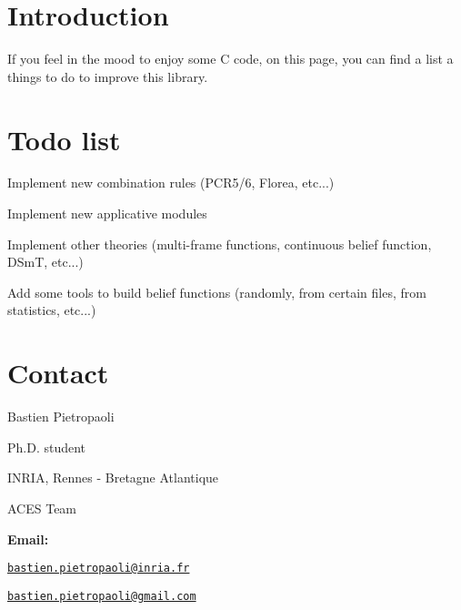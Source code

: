 \hypertarget{_t_o_d_o_TODO_Intro}{}\section{Introduction}\label{_t_o_d_o_TODO_Intro}
If you feel in the mood to enjoy some C code, on this page, you can find a list a things to do to improve this library.\hypertarget{_t_o_d_o_Todo_list}{}\section{Todo list}\label{_t_o_d_o_Todo_list}
\begin{DoxyItemize}
\item Implement new combination rules (PCR5/6, Florea, etc...) \item Implement new applicative modules \item Implement other theories (multi-\/frame functions, continuous belief function, DSmT, etc...) \item Add some tools to build belief functions (randomly, from certain files, from statistics, etc...)\end{DoxyItemize}
\hypertarget{_t_o_d_o_Todo_contact}{}\section{Contact}\label{_t_o_d_o_Todo_contact}
Bastien Pietropaoli \par
 Ph.D. student \par
 INRIA, Rennes -\/ Bretagne Atlantique \par
 ACES Team \par


{\bfseries Email:} \par
 \href{mailto:bastien.pietropaoli@inria.fr}{\tt bastien.pietropaoli@inria.fr} \par
 \href{mailto:bastien.pietropaoli@gmail.com}{\tt bastien.pietropaoli@gmail.com} \par
 